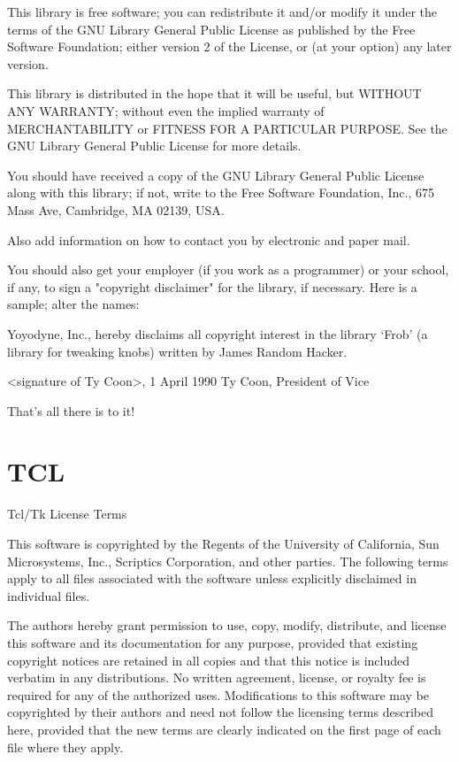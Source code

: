\documentclass[a4paper,twoside]{tceusermanual}
\begin{document}
    This library is free software; you can redistribute it and/or
    modify it under the terms of the GNU Library General Public
    License as published by the Free Software Foundation; either
    version 2 of the License, or (at your option) any later version.

    This library is distributed in the hope that it will be useful,
    but WITHOUT ANY WARRANTY; without even the implied warranty of
    MERCHANTABILITY or FITNESS FOR A PARTICULAR PURPOSE.  See the GNU
    Library General Public License for more details.

    You should have received a copy of the GNU Library General Public
    License along with this library; if not, write to the Free
    Software Foundation, Inc., 675 Mass Ave, Cambridge, MA 02139, USA.

Also add information on how to contact you by electronic and paper mail.

You should also get your employer (if you work as a programmer) or your
school, if any, to sign a "copyright disclaimer" for the library, if
necessary.  Here is a sample; alter the names:

  Yoyodyne, Inc., hereby disclaims all copyright interest in the
  library `Frob' (a library for tweaking knobs) written by James Random Hacker.

  <signature of Ty Coon>, 1 April 1990
  Ty Coon, President of Vice

That's all there is to it!

\section{TCL}

Tcl/Tk License Terms

This software is copyrighted by the Regents of the University of California, Sun Microsystems, Inc., Scriptics Corporation, and other parties. The following terms apply to all files associated with the software unless explicitly disclaimed in individual files.

The authors hereby grant permission to use, copy, modify, distribute, and license this software and its documentation for any purpose, provided that existing copyright notices are retained in all copies and that this notice is included verbatim in any distributions. No written agreement, license, or royalty fee is required for any of the authorized uses. Modifications to this software may be copyrighted by their authors and need not follow the licensing terms described here, provided that the new terms are clearly indicated on the first page of each file where they apply.
\end{document}
